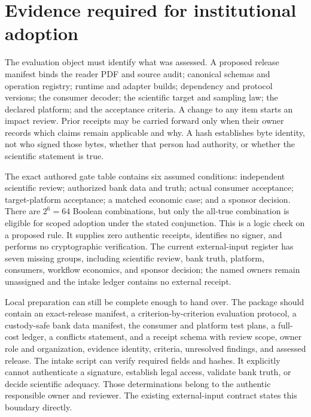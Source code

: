 \section{Evidence required for institutional adoption}
\label{exec17:signed-adoption}

The evaluation object must identify what was assessed. A proposed release
manifest binds the reader PDF and source audit; canonical schemas and operation
registry; runtime and adapter builds; dependency and protocol versions; the
consumer decoder; the scientific target and sampling law; the declared
platform; and the acceptance criteria. A change to any item starts an impact
review. Prior receipts may be carried forward only when their owner records
which claims remain applicable and why. A hash establishes byte identity, not
who signed those bytes, whether that person had authority, or whether the
scientific statement is true.

The exact authored gate table contains six assumed conditions: independent
scientific review; authorized bank data and truth; actual consumer acceptance;
target-platform acceptance; a matched economic case; and a sponsor decision.
There are $2^6=64$ Boolean combinations, but only the all-true combination is
eligible for scoped adoption under the stated conjunction. This is a logic
check on a proposed rule. It supplies zero authentic receipts, identifies no
signer, and performs no cryptographic verification. The current external-input
register has seven missing groups, including scientific review, bank truth,
platform, consumers, workflow economics, and sponsor decision; the named
owners remain unassigned and the intake ledger contains no external
receipt.~\citep{exec17_continuity_reference,exec17_continuity_contract}

Local preparation can still be complete enough to hand over. The package
should contain an exact-release manifest, a criterion-by-criterion evaluation
protocol, a custody-safe bank data manifest, the consumer and platform test
plans, a full-cost ledger, a conflicts statement, and a receipt schema with
review scope, owner role and organization, evidence identity, criteria,
unresolved findings, and assessed release. The intake script can verify
required fields and hashes. It explicitly cannot authenticate a signature,
establish legal access, validate bank truth, or decide scientific adequacy.
Those determinations belong to the authentic responsible owner and reviewer.
The existing external-input contract states this boundary directly.
\citep{exec17_continuity_contract}

